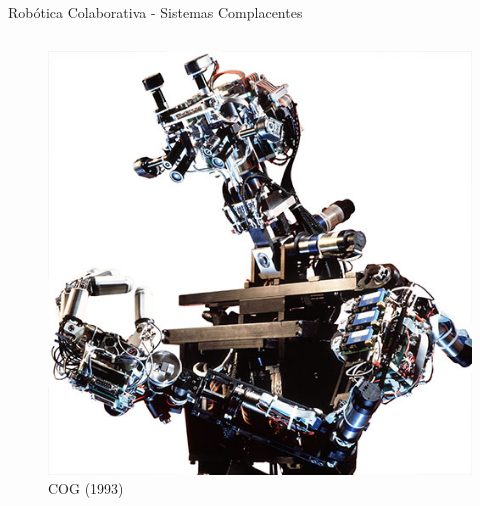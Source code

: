 \documentclass{beamer}
\begin{document}
\begin{frame}{Robótica Colaborativa - Sistemas Complacentes}
\begin{columns}
\begin{column}{0.50\textwidth}
\begin{figure}
    \centering
    \includegraphics[width = 0.5\linewidth]{tex/figs/cog-mit.jpg}
    \label{fig:mekainside}
    \\{COG (1993)}
\end{figure}


\end{column}
\end{columns}
\end{frame}
\end{document}
